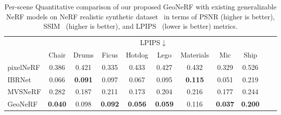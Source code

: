 \begin{table}[!t]
    \vspace{1.0ex}

    \begin{center}
        \begin{threeparttable}
            \begin{tabular}{l|cccccccccc}
            & \multicolumn{8}{c}{LPIPS$\downarrow$} \\
            &  Chair & Drums & Ficus & Hotdog & Lego & Materials & Mic & Ship \\
            \hline
            pixelNeRF & 0.386 & 0.421 & 0.335 & 0.433 & 0.427 & 0.432 & 0.329 & 0.526 \\
            IBRNet & 0.066 & \textbf{0.091} & 0.097 & 0.067 & 0.095 & \textbf{0.115} & 0.051 & 0.219 \\
            MVSNeRF & 0.282 & 0.187 & 0.211 & 0.173 & 0.204 & 0.216 & 0.177 & 0.244 \\
            GeoNeRF & \textbf{0.040} & 0.098 & \textbf{0.092} & \textbf{0.056} & \textbf{0.059} & 0.116 & \textbf{0.037} & \textbf{0.200} \\
            \hline
            \end{tabular}
        \end{threeparttable}
    \end{center}
    \vspace{3.0ex}
    \caption{Per-scene Quantitative comparison of our proposed GeoNeRF with existing generalizable NeRF models on NeRF realistic synthetic dataset~\citep{mildenhall2020nerf} in terms of PSNR (higher is better), SSIM~\citep{wang2004image} (higher is better), and LPIPS~\citep{zhang2018unreasonable} (lower is better) metrics.}
    \label{table:per_scene_no_ft_nerf}
\end{table}

\clearpage

